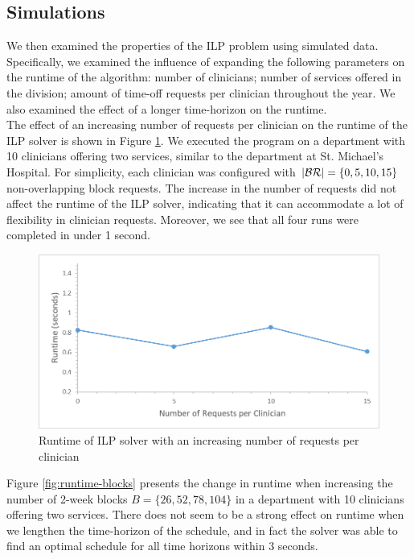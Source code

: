 

\subsection{Simulations}
We then examined the properties of the ILP problem using simulated data.
Specifically, we examined the influence of expanding the following parameters on
the runtime of the algorithm: number of clinicians; number of services offered
in the division; amount of time-off requests per clinician throughout the year.
We also examined the effect of a longer time-horizon on the runtime. \\

The effect of an increasing number of requests per clinician on the runtime of
the ILP solver is shown in Figure \ref{fig:runtime-requests}. We executed the
program on a department with 10 clinicians offering two services, similar to the
department at St. Michael's Hospital. For simplicity, each clinician was
configured with $\abs{\mathcal{BR}} = \{0, 5, 10, 15\}$ non-overlapping block
requests. The increase in the number of requests did not affect the runtime of
the ILP solver, indicating that it can accommodate a lot of flexibility in
clinician requests. Moreover, we see that all four runs were completed in under
1 second. \\

\begin{figure}[h]
	\centering
	\includegraphics[scale=.5]{fig/runtime_requests}
	\caption{Runtime of ILP solver with an increasing number of requests per
		clinician}
	\label{fig:runtime-requests}
\end{figure}

Figure \ref{fig:runtime-blocks} presents the change in runtime when increasing
the number of 2-week blocks $B = \{26, 52, 78, 104\}$ in a department with 10
clinicians offering two services. There does not seem to be a strong effect on
runtime when we lengthen the time-horizon of the schedule, and in fact the
solver was able to find an optimal schedule for all time horizons within 3
seconds. \\ %

